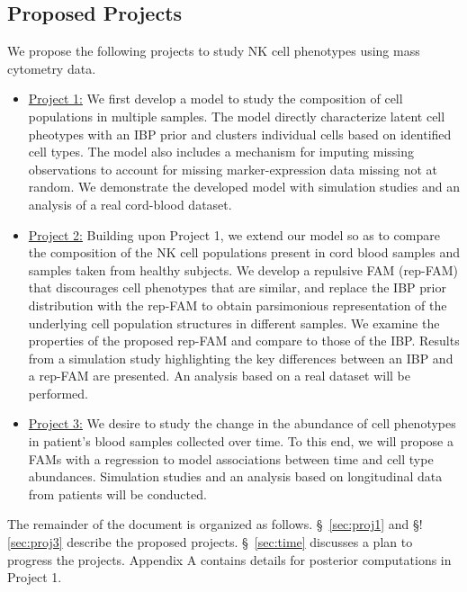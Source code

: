 \documentclass[12pt,]{article}
\begin{document}

\subsection{Proposed Projects}
We propose the following projects to study NK cell phenotypes using mass cytometry data. 
\begin{itemize}
\item \underline{Project 1:}
We first develop a model to study the composition of cell populations in
multiple samples.  The model directly characterize latent cell pheotypes with
an IBP prior and clusters individual cells based on identified cell types.  The
model also includes a mechanism for imputing missing observations to account
for missing marker-expression data missing not at random. We demonstrate the
developed model with simulation studies and an analysis of a real cord-blood
dataset.

\item \underline{Project 2:}
Building upon Project 1, we extend our model so as to compare the composition of
the NK cell populations present in cord blood samples and samples taken from
healthy subjects.  We develop a repulsive FAM (rep-FAM) that discourages cell
phenotypes that are similar, and replace the IBP prior distribution with the
rep-FAM to obtain parsimonious representation of the underlying cell population
structures in different samples.  We examine the properties of the proposed
rep-FAM and compare to those of the IBP.  Results from a simulation study
highlighting the key differences between an IBP and a rep-FAM are presented.
An analysis based on a real dataset will be performed.

\item \underline{Project 3:}
We desire to study the change in the abundance of cell phenotypes in patient's
blood samples collected over time. To this end, we will propose a FAMs with a
regression to model associations between time and cell type abundances.
Simulation studies and an analysis based on longitudinal data from patients
will be conducted.

\end{itemize} 
The remainder of the document is organized as follows.
\S~\ref{sec:proj1} and \S!\ref{sec:proj3} describe the proposed projects.
\S~\ref{sec:time} discusses a plan to progress the projects.  
Appendix A contains details for posterior computations in Project 1.
\end{document}
